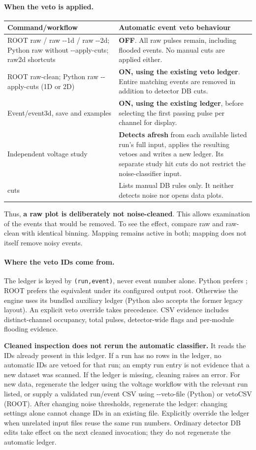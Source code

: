 \documentclass[11pt,a4paper]{article}
\begin{document}
\paragraph{When the veto is applied.}
\begin{longtable}{p{.40\linewidth}p{.50\linewidth}}
\toprule Command/workflow & Automatic event veto behaviour \\\midrule
ROOT raw / raw -{}-1d / raw -{}-2d; Python raw without -{}-apply-cuts; raw2d shortcuts &
\textbf{OFF}. All raw pulses remain, including flooded events. No manual cuts are applied either.\\
ROOT raw-clean; Python raw -{}-apply-cuts (1D or 2D) &
\textbf{ON, using the existing veto ledger}. Entire matching events are removed in addition to detector DB cuts.\\
Event/event3d, save and examples & \textbf{ON, using the existing ledger}, before selecting the first passing pulse per channel for display.\\
Independent voltage study & \textbf{Detects afresh} from each available listed run's full input, applies the resulting vetoes and writes a new ledger. Its separate study hit cuts do not restrict the noise-classifier input.\\
cuts & Lists manual DB rules only. It neither detects noise nor opens data plots.\\
\bottomrule
\end{longtable}
Thus, \textbf{a raw plot is deliberately not noise-cleaned}. This allows examination
of the events that would be removed. To see the effect, compare raw and raw-clean
with identical binning. Mapping remains active in both; mapping does not itself
remove noisy events.

\paragraph{Where the veto IDs come from.}
The ledger is keyed by \texttt{(run,event)}, never event number alone. Python prefers
; ROOT prefers the equivalent under
its configured output root. Otherwise the engine uses its bundled auxiliary ledger
(Python also accepts the former legacy layout). An explicit veto override takes
precedence. CSV evidence includes distinct-channel occupancy, total pulses,
detector-wide flags and per-module flooding evidence.

\textbf{Cleaned inspection does not rerun the automatic classifier.} It reads the
IDs already present in this ledger. If a run has no rows in the ledger, no automatic
IDs are vetoed for that run; an empty run entry is not evidence that a new dataset
was scanned. If the ledger is missing, cleaning raises an error. For new data,
regenerate the ledger using the voltage workflow with the relevant run listed, or
supply a validated run/event CSV using -{}-veto-file (Python) or vetoCSV (ROOT).
After changing noise thresholds, regenerate the ledger: changing settings alone
cannot change IDs in an existing file. Explicitly override the ledger when unrelated
input files reuse the same run numbers. Ordinary detector DB edits take effect on
the next cleaned invocation; they do not regenerate the automatic ledger.
\end{document}
